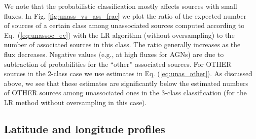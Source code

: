 \documentclass{aa}
\newcommand{\lb}{\label}
\begin{document}
We note that the probabilistic classification mostly affects sources with small fluxes.
In Fig. \ref{fig:unass_vs_ass_frac} we plot the ratio of the expected number of sources of a certain class among unassociated sources
computed according to Eq.~(\ref{eq:unassoc_ev}) with the LR algorithm (without oversampling) to the number of associated sources in this class.
The ratio generally increases as the flux decreases.
Negative values (e.g., at high fluxes for AGNs) are due to subtraction of probabilities for the ``other'' associated sources.
For OTHER sources in the 2-class case we use estimates in Eq. (\ref{eq:unas_other}).
As discussed above, we see that these estimates are significantly below the estimated numbers of OTHER sources among unassociated ones in the 3-class classification (for the LR method without oversampling in this case).


\subsection{Latitude and longitude profiles}
\lb{sec:lat-lon-profiles}
\end{document}
